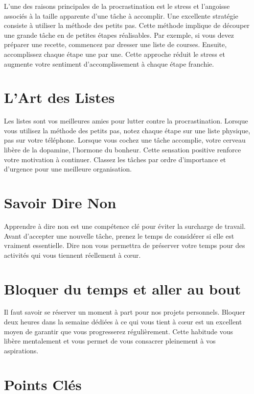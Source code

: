 \documentclass[a4paper, 10pt, garamond]{book}
\begin{document}
L'une des raisons principales de la procrastination est le stress et l'angoisse
associés à la taille apparente d'une tâche à accomplir. Une excellente
stratégie consiste à utiliser la méthode des petits pas. Cette méthode implique
de découper une grande tâche en de petites étapes réalisables. Par exemple, si
vous devez préparer une recette, commencez par dresser une liste de courses.
Ensuite, accomplissez chaque étape une par une. Cette approche réduit le stress
et augmente votre sentiment d'accomplissement à chaque étape franchie.

\section{L'Art des Listes}

Les listes sont vos meilleures amies pour lutter contre la procrastination.
Lorsque vous utilisez la méthode des petits pas, notez chaque étape sur une
liste physique, pas sur votre téléphone. Lorsque vous cochez une tâche
accomplie, votre cerveau libère de la dopamine, l'hormone du bonheur. Cette
sensation positive renforce votre motivation à continuer. Classez les tâches par
ordre d'importance et d'urgence pour une meilleure organisation.

\section{Savoir Dire Non}

Apprendre à dire non est une compétence clé pour éviter la surcharge de travail.
Avant d'accepter une nouvelle tâche, prenez le temps de considérer si elle est
vraiment essentielle. Dire non vous permettra de préserver votre temps pour des
activités qui vous tiennent réellement à cœur.

\section{Bloquer du temps et aller au bout}

Il faut savoir se réserver un moment à part pour nos projets personnels. Bloquer
deux heures dans la semaine dédiées à ce qui vous tient à cœur est un excellent
moyen de garantir que vous progresserez régulièrement. Cette habitude vous
libère mentalement et vous permet de vous consacrer pleinement à vos
aspirations.

\section{Points Clés}
\end{document}
